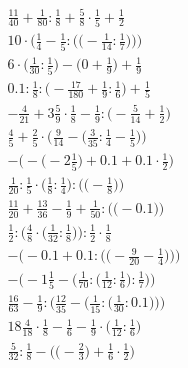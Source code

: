 \documentclass[8pt]{article}
\begin{document}
\begin{align}
\frac{11}{40} + \frac{1}{80} : \frac{1}{8} + \frac{5}{8} \cdot \frac{1}{5} + \frac{1}{2} \\
10 \cdot \bigg(\frac{1}{4} - \frac{1}{5} : \Big(\big(-\frac{1}{14} : \frac{1}{7}\big)\Big)\bigg) \\
6 \cdot \big(\frac{1}{30} : \frac{1}{5}\big) - \big(0 + \frac{1}{9}\big) + \frac{1}{9} \\
0.1 : \frac{1}{8} : \big(-\frac{17}{180} + \frac{1}{9} : \frac{1}{6}\big) + \frac{1}{5} \\
-\frac{4}{21} + 3\frac{5}{9} \cdot \frac{1}{8} - \frac{1}{9} : \big(-\frac{5}{14} + \frac{1}{2}\big) \\
\frac{4}{5} + \frac{2}{5} \cdot \Big(\frac{9}{14} - \big(\frac{3}{35} : \frac{1}{4} - \frac{1}{5}\big)\Big) \\
-\Big(-\big(-2\frac{1}{5}\big) + 0.1 + 0.1 \cdot \frac{1}{2}\Big) \\
\frac{1}{20} : \frac{1}{5} \cdot \Big(\frac{1}{8} : \frac{1}{4}\Big) : \Big(\big(-\frac{1}{8}\big)\Big) \\
\frac{11}{20} + \frac{13}{36} - \frac{1}{9} + \frac{1}{50} : \Big(\big(-0.1\big)\Big) \\
\frac{1}{2} : \Big(\frac{4}{8} \cdot \big(\frac{1}{32} : \frac{1}{8}\big)\Big) : \frac{1}{2} \cdot \frac{1}{8} \\
-\bigg(-0.1 + 0.1 : \Big(\big(-\frac{9}{20} - \frac{1}{4}\big)\Big)\bigg) \\
-\bigg(-1\frac{1}{5} - \Big(\frac{1}{70} : \big(\frac{1}{12} : \frac{1}{6}\big) : \frac{1}{7}\Big)\bigg) \\
\frac{16}{63} - \frac{1}{9} : \bigg(\frac{12}{35} - \Big(\frac{1}{15} : \big(\frac{1}{30} : 0.1\big)\Big)\bigg) \\
18\frac{4}{18} \cdot \frac{1}{8} - \frac{1}{6} - \frac{1}{9} \cdot \big(\frac{1}{12} : \frac{1}{6}\big) \\
\frac{5}{32} : \frac{1}{8} - \Big(\big(-\frac{2}{3}\big) + \frac{1}{6} \cdot \frac{1}{2}\Big)
\end{align}
\end{document}
